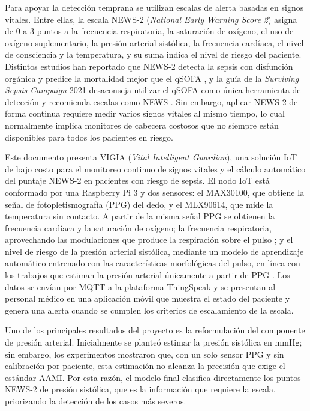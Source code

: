 \documentclass[11pt,a4paper]{article}
\begin{document}
Para apoyar la detección temprana se utilizan escalas de alerta basadas en signos vitales. Entre ellas, la escala NEWS-2 (\textit{National Early Warning Score 2}) asigna de 0 a 3 puntos a la frecuencia respiratoria, la saturación de oxígeno, el uso de oxígeno suplementario, la presión arterial sistólica, la frecuencia cardíaca, el nivel de consciencia y la temperatura, y su suma indica el nivel de riesgo del paciente. Distintos estudios han reportado que NEWS-2 detecta la sepsis con disfunción orgánica y predice la mortalidad mejor que el qSOFA \cite{ref6,ref7,ref8,ref9}, y la guía de la \textit{Surviving Sepsis Campaign} 2021 desaconseja utilizar el qSOFA como única herramienta de detección y recomienda escalas como NEWS \cite{ref10}. Sin embargo, aplicar NEWS-2 de forma continua requiere medir varios signos vitales al mismo tiempo, lo cual normalmente implica monitores de cabecera costosos que no siempre están disponibles para todos los pacientes en riesgo.

Este documento presenta VIGIA (\textit{Vital Intelligent Guardian}), una solución IoT de bajo costo para el monitoreo continuo de signos vitales y el cálculo automático del puntaje NEWS-2 en pacientes con riesgo de sepsis. El nodo IoT está conformado por una Raspberry Pi 3 y dos sensores: el MAX30100, que obtiene la señal de fotopletismografía (PPG) del dedo, y el MLX90614, que mide la temperatura sin contacto. A partir de la misma señal PPG se obtienen la frecuencia cardíaca y la saturación de oxígeno; la frecuencia respiratoria, aprovechando las modulaciones que produce la respiración sobre el pulso \cite{ref16}; y el nivel de riesgo de la presión arterial sistólica, mediante un modelo de aprendizaje automático entrenado con las características morfológicas del pulso, en línea con los trabajos que estiman la presión arterial únicamente a partir de PPG \cite{ref12,ref13,ref14,ref15}. Los datos se envían por MQTT a la plataforma ThingSpeak y se presentan al personal médico en una aplicación móvil que muestra el estado del paciente y genera una alerta cuando se cumplen los criterios de escalamiento de la escala.

Uno de los principales resultados del proyecto es la reformulación del componente de presión
 arterial. Inicialmente se planteó estimar la presión sistólica en mmHg; sin embargo, los 
 experimentos mostraron que, con un solo sensor PPG y sin calibración por paciente,
  esta estimación no alcanza la precisión que exige el estándar AAMI. Por esta razón, 
  el modelo final clasifica directamente los puntos NEWS-2 de presión sistólica, que es 
  la información que requiere la escala, priorizando la detección de los casos más severos.
\end{document}
